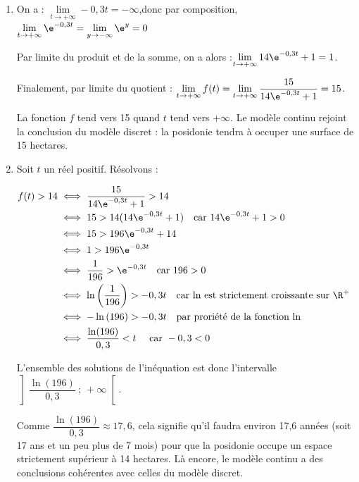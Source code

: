 \begin{enumerate}
	La seule fonction solution de $(E_2)$ vérifiant $g(0) = 1$ est donc

	$g : t \longmapsto \dfrac{14}{15} \e^{-0,3t} + \dfrac{1}{15}$.

	On en déduit donc que, pour tout $t$ réel positif, on a :\quad
	$\begin{aligned}[t]
		f(t) &=\dfrac{1}{g(t)}\\
			&= \dfrac{1}{\dfrac{14}{15} \e^{-0,3t} + \dfrac{1}{15}}\\
			&= \dfrac{15}{14 \e^{-0,3t} + 1}\\
	\end{aligned} $

	On arrive bien à l'expression annoncée.

	\item On a : \quad $\lim\limits_{t \to +\infty} -0,3t = -\infty$,\quad donc par composition, $\lim\limits_{t \to +\infty} \e^{-0,3t} = \lim\limits_{y\to -\infty} \e^{y} = 0$

	Par limite du produit et de la somme, on a alors :\quad $\lim\limits_{t \to +\infty} 14\e^{-0,3t} + 1  =1$.

	Finalement, par limite du quotient : \quad $\lim\limits_{t \to +\infty} f(t) = \lim\limits_{t \to +\infty} \dfrac{15}{14\e^{-0,3t} + 1}  =15$.

	La fonction $f$ tend vers 15 quand $t$ tend vers $+\infty$. Le modèle continu rejoint la conclusion du modèle discret : la posidonie tendra à occuper une surface de 15 hectares.

	\item Soit $t$ un réel positif. Résolvons :

	$\begin{aligned}
		f(t) > 14
			&\iff \dfrac{15}{14\e^{-0,3t} + 1} > 14\\
			&\iff 15 > 14(14\e^{-0,3t} + 1) \quad \text{car } 14\e^{-0,3t} + 1 > 0\\
			&\iff 15 > 196 \e^{-0,3t} + 14\\
			&\iff 1 > 196 \e^{-0,3t}\\
			&\iff \dfrac{1}{196} > \e^{-0,3t} \quad \text{car } 196 >0\\
			&\iff \ln\left(\dfrac{1}{196}\right) > -0,3t \quad \text{car ln est strictement croissante sur } \R^+\\
			&\iff -\ln\left(196\right) > -0,3t \quad \text{par proriété de la fonction ln}\\
			&\iff \dfrac{\ln(196)}{0,3} < t \quad \text{ car } -0,3 < 0\\
	\end{aligned}$

	L'ensemble des solutions de l'inéquation est donc l'intervalle $\left]\dfrac{\ln(196)}{0,3}~;~+\infty\right[ $.

	Comme $ \dfrac{\ln(196)}{0,3}\approx 17,6$, cela signifie qu'il faudra environ 17,6 années (soit 17 ans et un peu plus de 7 mois) pour que la posidonie occupe un espace strictement supérieur à 14 hectares. Là encore, le modèle continu a des conclusions cohérentes avec celles du modèle discret.

\end{enumerate}
